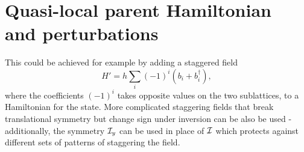 
\section{Quasi-local parent Hamiltonian and perturbations}

\label{sec:perturbations}

This could be achieved for example by adding a staggered field 
$$
H' = h \sum\limits_{i} (-1)^i \left(b_i + b_i^{\dagger}\right),
$$
where the coefficients $(-1)^i$ takes opposite values on the two sublattices, 
to a Hamiltonian for the state. More complicated staggering fields that break translational 
symmetry but change sign under inversion can be also be used - additionally, the symmetry $\mathcal{I}_y$ 
can be used in place of $\mathcal{I}$ which protects against different sets of patterns of staggering the 
field.

